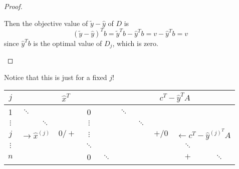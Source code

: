 \begin{proof}
\begin{enumerate}
\begin{enumerate}
					Then the objective value of \(\widetilde{y}-\hat{y}\) of \(D\) is
					\[
						\left( \widetilde{y}-\hat{y} \right)^{T}b = \widetilde{y}^{T}b - \hat{y}^{T}b = v - \hat{y}^{T}b = v
					\]
					since \(\hat{y}^{T}b\) is the optimal value of \(D_{j}\), which is zero.
			\end{enumerate}
	\end{enumerate}
\end{proof}

Notice that this is just for a fixed \(j\)!
\begin{table}[H]
	\centering
	\begin{tabular}{c|ccccc|ccccc}
		\toprule
		\(j\)      & \multicolumn{5}{c|}{\(\hat{x}^{T}\)}      & \multicolumn{5}{c}{\(c^{T} - \hat{y}^{T}A\)}                                                                                                                                                                                                                        \\
		\midrule
		1          & \(\ddots\)                                &                                              &                   & 0            &            & \(\ddots\)                                       &            &                                                                            &            &            \\
		\(\vdots\) &                                           & \(\ddots\)                                   &                   & \(\vdots\)   &            &                                                  & \(\ddots\) &                                                                            &            &            \\
		\(j\)      & \multicolumn{2}{c}{\(\to \hat{x}^{(j)}\)} & \(0/+\)                                      & \(\vdots\)        &              &            &                                                  & \(+/0\)    & \multicolumn{2}{c}{\footnotesize{\(\leftarrow c^{T}-\hat{y}^{(j)^{T}}A\)}}                           \\
		\(\vdots\) &                                           &                                              &                   & \(\ddots\)   &            &                                                  &            &                                                                            & \(\ddots\) &            \\
		\(n\)      &                                           &                                              &                   & 0            & \(\ddots\) &                                                  &            &                                                                            & \(+\)      & \(\ddots\) \\

\end{tabular}
\end{table}
